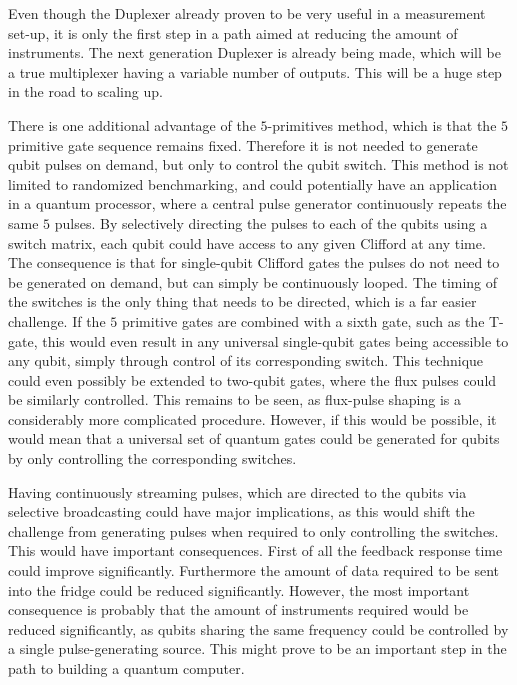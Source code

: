     Even though the Duplexer already proven to be very useful in a measurement set-up, it is only the first step in a path aimed at reducing the amount of instruments. The next generation Duplexer is already being made, which will be a true multiplexer having a variable number of outputs. This will be a huge step in the road to scaling up.

    There is one additional advantage of the $5$-primitives method, which is that the $5$ primitive gate sequence remains fixed. Therefore it is not needed to generate qubit pulses on demand, but only to control the qubit switch. This method is not limited to randomized benchmarking, and could potentially have an application in a quantum processor, where a central pulse generator continuously repeats the same $5$ pulses. By selectively directing the pulses to each of the qubits using a switch matrix, each qubit could have access to any given Clifford at any time. The consequence is that for single-qubit Clifford gates the pulses do not need to be generated on demand, but can simply be continuously looped. The timing of the switches is the only thing that needs to be directed, which is a far easier challenge. If the $5$ primitive gates are combined with a sixth gate, such as the T-gate, this would even result in any universal single-qubit gates being accessible to any qubit, simply through control of its corresponding switch.  This technique could even possibly be extended to two-qubit gates, where the flux pulses could be similarly controlled. This remains to be seen, as flux-pulse shaping is a considerably more complicated procedure. However, if this would be possible, it would mean that a universal set of quantum gates could be generated for qubits by only controlling the corresponding switches.

    Having continuously streaming pulses, which are directed to the qubits via selective broadcasting could have major implications, as this would shift the challenge from generating pulses when required to only controlling the switches. This would have important consequences. First of all the feedback response time could improve significantly. Furthermore the amount of data required to be sent into the fridge could be reduced significantly. However, the most important consequence is probably that the amount of instruments required would be reduced significantly, as qubits sharing the same frequency could be controlled by a single pulse-generating source. This might prove to be an important step in the path to building a quantum computer.